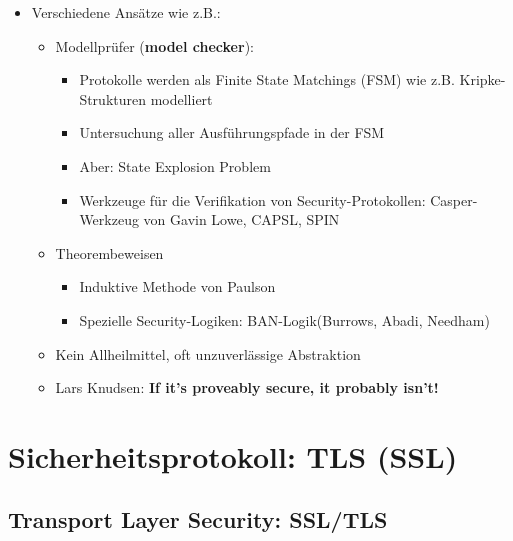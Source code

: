 \documentclass[openany]{book}
\begin{document}
\begin{itemize}
    \item Verschiedene Ansätze wie z.B.:
    \begin{itemize}
        \item Modellprüfer (\textbf{model checker}):
        \begin{itemize}
            \item Protokolle werden als Finite State Matchings (FSM) wie z.B. Kripke-Strukturen modelliert
            \item Untersuchung aller Ausführungspfade in der FSM
            \item Aber: State Explosion Problem
            \item Werkzeuge für die Verifikation von Security-Protokollen: Casper-Werkzeug von Gavin Lowe, CAPSL, SPIN 
        \end{itemize}
        \item Theorembeweisen
        \begin{itemize}
            \item Induktive Methode von Paulson
            \item Spezielle Security-Logiken: BAN-Logik(Burrows, Abadi, Needham)
        \end{itemize}
        \item Kein Allheilmittel, oft unzuverlässige Abstraktion
        \item Lars Knudsen: \textbf{If it's proveably secure, it probably isn't!}
    \end{itemize}
\end{itemize}

\chapter{Sicherheitsprotokoll: TLS (SSL)}

\section{Transport Layer Security: SSL/TLS}
\end{document}
